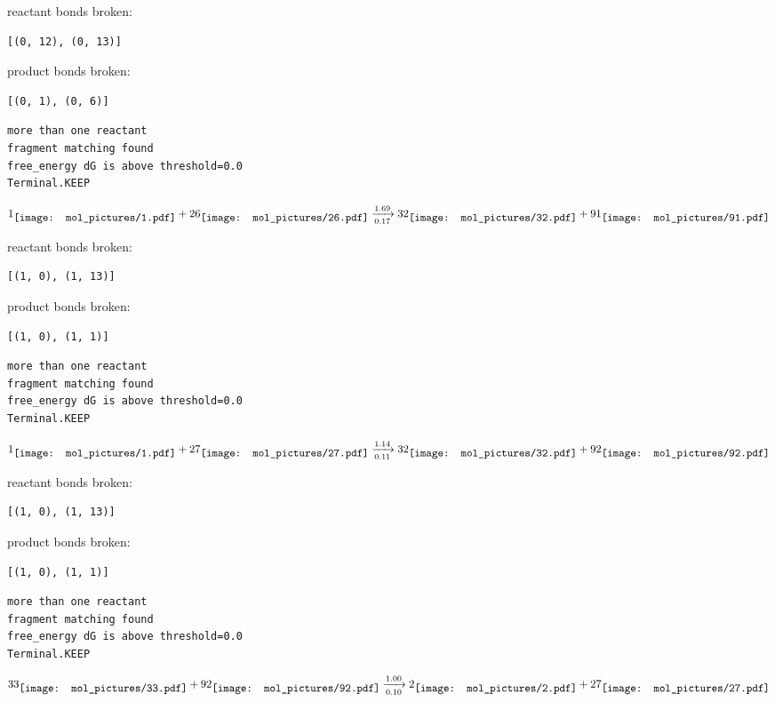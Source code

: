 \documentclass{article}
\begin{document}
reactant bonds broken:\begin{verbatim}
[(0, 12), (0, 13)]
\end{verbatim}
product bonds broken:\begin{verbatim}
[(0, 1), (0, 6)]
\end{verbatim}




\vspace{1cm}
\begin{verbatim}
more than one reactant
fragment matching found
free_energy dG is above threshold=0.0
Terminal.KEEP
\end{verbatim}
$$
1
\raisebox{-.5\height}{\texttt{[image: mol\_pictures/1.pdf]}}
+
26
\raisebox{-.5\height}{\texttt{[image: mol\_pictures/26.pdf]}}
\xrightarrow[0.17]{1.69}
32
\raisebox{-.5\height}{\texttt{[image: mol\_pictures/32.pdf]}}
+
91
\raisebox{-.5\height}{\texttt{[image: mol\_pictures/91.pdf]}}
$$


reactant bonds broken:\begin{verbatim}
[(1, 0), (1, 13)]
\end{verbatim}
product bonds broken:\begin{verbatim}
[(1, 0), (1, 1)]
\end{verbatim}




\vspace{1cm}
\begin{verbatim}
more than one reactant
fragment matching found
free_energy dG is above threshold=0.0
Terminal.KEEP
\end{verbatim}
$$
1
\raisebox{-.5\height}{\texttt{[image: mol\_pictures/1.pdf]}}
+
27
\raisebox{-.5\height}{\texttt{[image: mol\_pictures/27.pdf]}}
\xrightarrow[0.11]{1.14}
32
\raisebox{-.5\height}{\texttt{[image: mol\_pictures/32.pdf]}}
+
92
\raisebox{-.5\height}{\texttt{[image: mol\_pictures/92.pdf]}}
$$


reactant bonds broken:\begin{verbatim}
[(1, 0), (1, 13)]
\end{verbatim}
product bonds broken:\begin{verbatim}
[(1, 0), (1, 1)]
\end{verbatim}




\vspace{1cm}
\begin{verbatim}
more than one reactant
fragment matching found
free_energy dG is above threshold=0.0
Terminal.KEEP
\end{verbatim}
$$
33
\raisebox{-.5\height}{\texttt{[image: mol\_pictures/33.pdf]}}
+
92
\raisebox{-.5\height}{\texttt{[image: mol\_pictures/92.pdf]}}
\xrightarrow[0.10]{1.00}
2
\raisebox{-.5\height}{\texttt{[image: mol\_pictures/2.pdf]}}
+
27
\raisebox{-.5\height}{\texttt{[image: mol\_pictures/27.pdf]}}
$$
\end{document}
